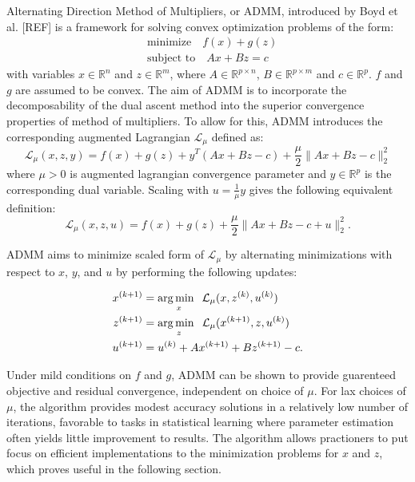 Alternating Direction Method of Multipliers, or ADMM, introduced by Boyd et al. [REF] is a framework for solving convex optimization problems of the form:
\begin{equation}
    \label{admm:prob}
    \begin{aligned}
    &\text{minimize} \quad f(x) + g(z) \\
    &\text{subject to} \quad Ax + Bz = c
    \end{aligned}
\end{equation}
with variables $x \in \mathbb{R}^{n}$ and $z \in \mathbb{R}^{m}$, where $A \in \mathbb{R}^{p \times n}$, $B \in \mathbb{R}^{p \times m}$ and $c \in \mathbb{R}^{p}$. $f$ and $g$ are assumed to be convex. The aim of ADMM is to incorporate the decomposability of the dual ascent method into the superior convergence properties of method of multipliers. To allow for this, ADMM introduces the corresponding augmented Lagrangian $\mathcal{L}_{\mu}$ defined as:
\begin{equation}
    \label{admm:lagrangian}
    \mathcal{L}_{\mu}(x,z,y) = f(x) + g(z) + y^T(Ax + Bz - c) + \frac{\mu}{2} \|Ax + Bz - c\|_2^2
\end{equation}
where $\mu > 0$ is augmented lagrangian convergence parameter and $y \in \mathbb{R}^{p}$ is the corresponding dual variable. Scaling with $u  = \frac{1}{\mu} y $ gives the following equivalent definition: 
\begin{equation}
    \label{admm:lagrangian-real}
    \mathcal{L}_{\mu}(x,z,u) = f(x) + g(z) + \frac{\mu}{2} \|Ax + Bz - c + u\|_2^2.
\end{equation}

ADMM aims to minimize scaled form of $\mathcal{L}_{\mu}$ by alternating minimizations with respect to $x$, $y$, and $u$ by performing the following updates:

\begin{equation}
    \label{admm:updates}
    \begin{aligned}
        x^{(k+1)} &= \operatorname*{arg\,min \;\;}_{x} \mathcal{L}_{\mu}(x,z^{(k)},u^{(k)})  \\
        z^{(k+1)} &= \operatorname*{arg\,min \;\;}_{z} \mathcal{L}_{\mu}(x^{(k+1)},z,u^{(k)}) \\
        u^{(k+1)} &= u^{(k)} + Ax^{(k+1)} + Bz^{(k+1)} - c.
    \end{aligned} 
\end{equation}

Under mild conditions on $f$ and $g$, ADMM can be shown to provide guarenteed objective and residual convergence, independent on choice of $\mu$. For lax choices of $\mu$, the algorithm provides modest accuracy solutions in a relatively low number of iterations, favorable to tasks in statistical learning where parameter estimation often yields little improvement to results. The algorithm allows practioners to put focus on efficient implementations to the minimization problems for $x$ and $z$, which proves useful in the following section.

